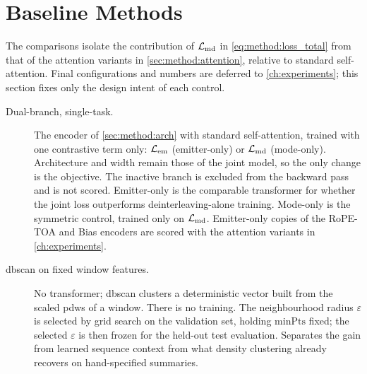 \section{Baseline Methods}\label{sec:method:baselines}

The comparisons isolate the contribution of $\mathcal{L}_{\mathrm{md}}$ in \cref{eq:method:loss_total} from that of the attention variants in \cref{sec:method:attention}, relative to standard self-attention.
Final configurations and numbers are deferred to \cref{ch:experiments}; this section fixes only the design intent of each control.

\begin{description}
  \item[Dual-branch, single-task.] The encoder of \cref{sec:method:arch} with standard self-attention, trained with one contrastive term only: $\mathcal{L}_{\mathrm{em}}$ (emitter-only) or $\mathcal{L}_{\mathrm{md}}$ (mode-only).
  Architecture and width remain those of the joint model, so the only change is the objective.
  The inactive branch is excluded from the backward pass and is not scored.
  Emitter-only is the comparable transformer for whether the joint loss outperforms deinterleaving-alone training.
  Mode-only is the symmetric control, trained only on $\mathcal{L}_{\mathrm{md}}$.
  Emitter-only copies of the RoPE-TOA and Bias encoders are scored with the attention variants in \cref{ch:experiments}.

  \item[\Gls{dbscan} on fixed window features.] No transformer; \gls{dbscan} \parencite{ester1996density} clusters a deterministic vector built from the scaled \glspl{pdw} of a window.
  There is no training.
  The neighbourhood radius $\varepsilon$ is selected by grid search on the validation set, holding $\mathrm{minPts}$ fixed; the selected $\varepsilon$ is then frozen for the held-out test evaluation.
  Separates the gain from learned sequence context from what density clustering already recovers on hand-specified summaries.
\end{description}
